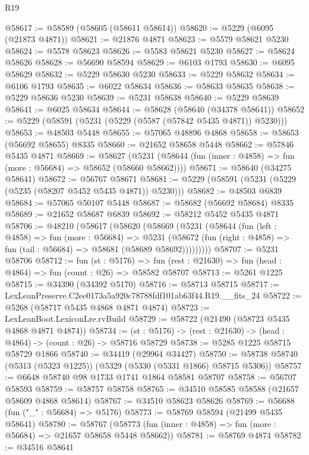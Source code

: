 \begin{lexlean}{R19}
\begin{coremodule}
@58617 := @58589 (@58605 (@58611 @58614))
@58620 := @5229 (@6095 (@21873 @4871))
@58621 := @21876 @4871
@58623 := @5579 @58621 @5230
@58624 := @5578 @58623
@58626 := @5583 @58621 @5230
@58627 := @58624 @58626
@58628 := @56690 @58594
@58629 := @6103 @1793
@58630 := @6095 @58629
@58632 := @5229 @58630 @5230
@58633 := @5229 @58632
@58634 := @6106 @1793
@58635 := @6022 @58634
@58636 := @58633 @58635
@58638 := @5229 @58636 @5230
@58639 := @5231 @58638
@58640 := @5229 @58639
@58641 := @6025 @58634
@58644 := @58628 (@58640 (@34378 @58641))
@58652 := @5229 (@58591 (@5231 (@5229 (@5587 (@57842 @5435 @4871)) @5230)))
@58653 := @48503 @5448
@58655 := @57065 @48896 @4868
@58658 := @58653 (@56692 @58655) @8335
@58660 := @21652 @58658 @5448
@58662 := @57846 @5435 @4871
@58669 := @58627
    (@5231 (@58644 (fun (inner : @4858) => fun (more : @56684) => @58652 (@58660 @58662))))
@58671 := @58640 (@34275 @58641)
@58672 := @56767 @58671
@58681 := @5229 (@58591 (@5231 (@5229 (@5235 (@58207 @5452 @5435 @4871)) @5230)))
@58682 := @48503 @6839
@58684 := @57065 @50107 @5448
@58687 := @58682 (@56692 @58684) @8335
@58689 := @21652 @58687 @6839
@58692 := @58212 @5452 @5435 @4871
@58706 := @48210
    (@58617
      (@58620
        (@58669
          (@5231
            (@58644
              (fun (left : @4858) =>
              fun (more : @56684) =>
              @5231
                (@58672
                  (fun (right : @4858) => fun (tail : @56684) => @58681 (@58689 @58692)))))))))
@58707 := @5231 @58706
@58712 := fun (st : @5176) =>
  fun (rest : @21630) => fun (head : @4864) => fun (count : @26) => @58582 @58707
@58713 := @5261 @1225
@58715 := @34390 (@34392 @5170)
@58716 := @58713 @58715
@58717 := LexLeanPreserve.C2ee0173a5a920c78788fdf101ab63f44.R19.__fits_24
@58722 := @5268 (@58717 @5435 @4868 @4871 @4874)
@58723 := LexLeanBoot.LexiconLre.rvBuild
@58729 := @58722 (@21490 (@58723 @5435 @4868 @4871 @4874))
@58734 := (st : @5176) -> (rest : @21630) -> (head : @4864) -> (count : @26) -> @58716 @58729
@58738 := @5285 @1225 @58715 @58729 @1866
@58740 := @34419 (@29964 @34427)
@58750 := @58738 @58740 (@5313 (@5323 @1225)) (@5329 (@5330 (@5331 @1866) @58715 @5306))
@58757 := @6648 @58740 @98 @1733 @1741 @1864 @58581 @58707
@58758 := @56707 @58593
@58759 := @58757 @58758
@58765 := @34510 @58585 @58588 (@21657 @58609 @4868 @58614)
@58767 := @34510 @58623 @58626
@58769 := @56688 (fun ("_" : @56684) => @5176)
@58773 := @58769 @58594 (@21499 @5435 @58641)
@58780 := @58767 (@58773 (fun (inner : @4858) => fun (more : @56684) => @21657 @58658 @5448 @58662))
@58781 := @58769 @4874
@58782 := @34516 @58641

\end{coremodule}
\end{lexlean}
